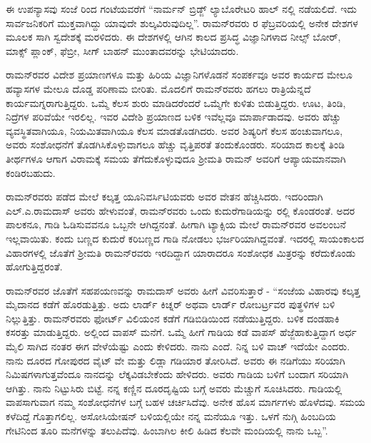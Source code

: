 ಈ ಉಪನ್ಯಾಸವು ಸಂಜೆ  ರಿಂದ  ಗಂಟೆಯವರೆಗೆ “ನಾರ್ಮನ್ ಬ್ರಿಡ್ಜ್ ಲ್ಯಾಬೊರೇಟರಿ ಹಾಲ್ ನಲ್ಲಿ ನಡೆಯಲಿದೆ. ಇದು ಸಾರ್ವಜನಿಕರಿಗೆ ಮುಕ್ತವಾಗಿದ್ದು ಯಾವುದೇ ಶುಲ್ಕವಿರುವುದಿಲ್ಲ”. ರಾಮನ್‍ರವರು ರ ಫೆಬ್ರವರಿಯಲ್ಲಿ ಅನೇಕ ದೇಶಗಳ ಮೂಲಕ ಸಾಗಿ ಸ್ವದೇಶಕ್ಕೆ ಮರಳಿದರು. ಈ ದೇಶಗಳಲ್ಲಿ ಆಗಿನ ಕಾಲದ ಪ್ರಸಿದ್ಧ ವಿಜ್ಞಾನಿಗಳಾದ ನೀಲ್ಸ್ ಬೋರ್, ಮಾಕ್ಸ್ ಪ್ಲಾಂಕ್, ಫೆಬ್ರೀ, ಸೀಗ್ ಬಾಹನ್ ಮುಂತಾದವರನ್ನು ಭೇಟಿಯಾದರು.

ರಾಮನ್‍ರವರ ವಿದೇಶ ಪ್ರಯಾಣಗಳೂ ಮತ್ತು ಹಿರಿಯ ವಿಜ್ಞಾನಿಗಳೊಡನೆ ಸಂಪರ್ಕವೂ ಅವರ ಕಾರ್ಯದ ಮೇಲೂ ಹವ್ಯಾಸಗಳ ಮೇಲೂ ದೊಡ್ಡ ಪರಿಣಾಮ ಬೀರಿತು. ಮೊದಲಿಗೆ ರಾಮನ್‍ರವರು ಹಗಲು ರಾತ್ರಿಯೆನ್ನದೆ ಕಾರ್ಯಮಗ್ನರಾಗುತ್ತಿದ್ದರು. ಒಮ್ಮೆ ಕೆಲಸ ಶುರು ಮಾಡಿದರೆಂದರೆ ಒಮ್ಮೆಗೇ ಕುಳಿತು ಬಿಡುತ್ತಿದ್ದರು. ಊಟ, ತಿಂಡಿ, ನಿದ್ರೆಗಳ ಪರಿವೆಯೇ ಇರಲಿಲ್ಲ. ಇವರ ವಿದೇಶಿ ಪ್ರಯಾಣದ ಬಳಿಕ ಇವೆಲ್ಲವೂ ಮಾರ್ಪಾಡಾದವು. ಅವರು ಹೆಚ್ಚು ವ್ಯವಸ್ಥಿತವಾಗಿಯೂ, ನಿಯಮಿತವಾಗಿಯೂ ಕೆಲಸ ಮಾಡತೊಡಗಿದರು. ಅವರ ಶಿಷ್ಯರಿಗೆ ಕೆಲಸ ಹಂಚುವಾಗಲೂ, ಅವರು ಸಂಶೋಧನೆಗೆ ತೊಡಗಿಸಿಕೊಳ್ಳುವಾಗಲೂ ಹೆಚ್ಚು ವೃತ್ತಿಪರತೆ ತಂದುಕೊಂಡರು. ಸರಿಯಾದ ಕಾಲಕ್ಕೆ ತಿಂಡಿ ತೀರ್ಥಗಳೂ ಆಗಾಗ ವಿರಾಮಕ್ಕೆ ಸಮಯ ತೆಗೆದುಕೊಳ್ಳುವುದೂ ಶ‍್ರೀಮತಿ ರಾಮನ್ ಅವರಿಗೆ ಆಪ್ಯಾಯಮಾನವಾಗಿ ಕಂಡಿರಬಹುದು. 

ರಾಮನ್‍ರವರು  ಪಡೆದ ಮೇಲೆ ಕಲ್ಕತ್ತ ಯೂನಿವರ್ಸಿಟಿಯವರು ಅವರ ವೇತನ ಹೆಚ್ಚಿಸಿದರು. ಇದರಿಂದಾಗಿ ಎಲ್.ಎ.ರಾಮದಾಸ್ ಅವರು ಹೇಳುವಂತೆ, ರಾಮನ್‍ರವರು ಒಂದು ಕುದುರೆಗಾಡಿಯನ್ನು ರಲ್ಲಿ ಕೊಂಡರಂತೆ. ಅದರ ಪಾಲಕನೂ, ಗಾಡಿ ಓಡಿಸುವವನೂ ಒಬ್ಬನೇ ಆಗಿದ್ದನಂತೆ. ಹೀಗಾಗಿ ಟ್ಯಾಕ್ಸಿಯ ಮೇಲೆ ರಾಮನ್‍ರವರ ಅವಲಂಬನೆ ಇಲ್ಲವಾಯಿತು. ಕಂದು ಬಣ್ಣದ ಕುದುರೆ ಕರಿಬಣ್ಣದ ಗಾಡಿ ನೋಡಲು ಭರ್ಜರಿಯಾಗಿದ್ದವಂತೆ. ಇದರಲ್ಲಿ ಸಾಯಂಕಾಲದ ವಿಹಾರಗಳಲ್ಲಿ ಜೊತೆಗೆ ಶ‍್ರೀಮತಿ ರಾಮನ್‍ರವರು ಇರದಿದ್ದಾಗ ಯಾರಾದರೂ ಸಂಶೋಧಕ ಮಿತ್ರರನ್ನು ಕರೆದುಕೊಂಡು ಹೋಗುತ್ತಿದ್ದರಂತೆ. 

ರಾಮನ್‍ರವರ ಜೊತೆಗೆ ಸಹಪಯಣವನ್ನು ರಾಮದಾಸ್ ಅವರು ಹೀಗೆ ವಿವರಿಸುತ್ತಾರೆ - “ಸಂಜೆಯ ವಿಹಾರವು ಕಲ್ಕತ್ತ ಮೈದಾನದ ಕಡೆಗೆ ಹೊರಡುತ್ತಿತ್ತು. ಅದು ಲಾರ್ಡ್ ಕಿಚ್ನರ್ ಅಥವಾ ಲಾರ್ಡ್ ರೋಬರ್ಟ್ರವರ ಪುತ್ಥಳಿಗಳ ಬಳಿ ನಿಲ್ಲುತ್ತಿತ್ತು. ರಾಮನ್‍ರವರು ಫೋರ್ಟ್ ವಿಲಿಯಂನ ಕಡೆಗೆ ಗಡಿಬಿಡಿಯಿಂದ ನಡೆಯುತ್ತಿದ್ದರು. ಬಳಿಕ ದಂಡಹಾಕಿ ಕಸರತ್ತು ಮಾಡುತ್ತಿದ್ದರು. ಅಲ್ಲಿಂದ ವಾಪಸ್ ಮನೆಗೆ. ಒಮ್ಮೆ ಹೀಗೆ ಗಾಡಿಯ ಕಡೆ ವಾಪಸ್ ಹೆಜ್ಜೆಹಾಕುತ್ತಿದ್ದಾಗ ಅರ್ಧ ಮೈಲಿ ಸಾಗಿದ ನಂತರ ಈಗ ವೇಳೆಯೆಷ್ಟು ಎಂದು ಕೇಳಿದರು. ನಾನು  ಎಂದೆ. ನಿನ್ನ ಬಳಿ ವಾಚ್ ಇದೆಯೇ ಎಂದರು. ನಾನು ದೂರದ ಗೋಪುರದ ವೈಟ್ ವೇ ಮತ್ತು ಲಿಡ್ಲಾ ಗಡಿಯಾರ ತೋರಿಸಿದೆ. ಅವರು ಈ ನಡಿಗೆಯು ಸರಿಯಾಗಿ  ನಿಮಿಷಗಳಾಗುತ್ತವೆಂದೂ ನಾನದನ್ನು ಲೆಕ್ಕವಿಡಬೇಕೆಂದು ಹೇಳಿದರು. ಅವರು ಗಾಡಿಯ ಬಳಿಗೆ ಬಂದಾಗ ಸರಿಯಾಗಿ  ಆಗಿತ್ತು. ನಾನು ನಿಟ್ಟುಸಿರು ಬಿಟ್ಟೆ. ನನ್ನ ಕಣ್ಣಿನ ದೂರದೃಷ್ಟಿಯ ಬಗ್ಗೆ ಅವರು ಮೆಚ್ಚುಗೆ ಸೂಚಿಸಿದರು. ಗಾಡಿಯಲ್ಲಿ ವಾಪಸಾಗುವಾಗ ನಮ್ಮ ಸಂಶೋಧನೆಗಳ ಬಗ್ಗೆ ಬಹಳ ಚರ್ಚಿಸಿದೆವು. ಅನೇಕ ಹೊಸ ಮಾರ್ಗಗಳು ಹೊಳೆದವು. ಸಮಯ ಕಳೆದಿದ್ದೆ ಗೊತ್ತಾಗಲಿಲ್ಲ. ಅಸೋಸಿಯೇಷನ್ ಬಳಿಯಲ್ಲಿಯೇ ನನ್ನ ಮನೆಯೂ ಇತ್ತು. ಒಳಗೆ ನುಗ್ಗಿ ಹಿಂಬದಿಯ ಗೇಟಿನಿಂದ ತೂರಿ ಮನೆಗಳನ್ನು ತಲುಪಿದೆವು. ಹಿಂಬಾಗಿಲ ಕೀಲಿ ಹಿಡಿದ ಕೆಲವೇ ಮಂದಿಯಲ್ಲಿ ನಾನು ಒಬ್ಬ”.



